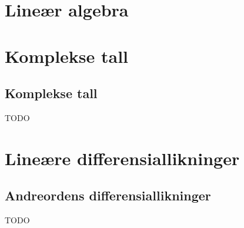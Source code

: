 
\newcommand{\kapittel}[2]{\chapter{#2}}
\newcommand{\kapittelslutt}{}
\renewcommand{\kapittelemnenavn}{}



\def\inkludert{1}


\setlength{\cftpartnumwidth}{3em}

\frontmatter
\tableofcontents*


\mainmatter
\part{Lineær algebra}



























\part{Komplekse tall}

\chapter{Komplekse tall}

TODO

\part{Lineære differensiallikninger}

\chapter{Andreordens differensiallikninger}

TODO


